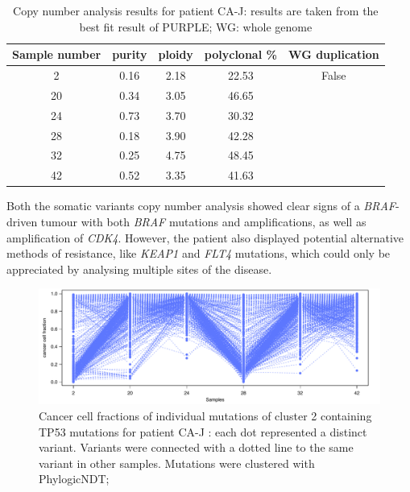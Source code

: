 \begin{table}[ht]
\caption[Copy number analysis results for patient CA-J]{Copy number analysis results for patient CA-J: results are taken from the best fit result of PURPLE; WG: whole genome}\label{tab:ca80cnv}
\centering
{}
\begin{tabular}{|c|c|c|c|c|}
\toprule
\hline
 \rowcolor{gray!50}
\textbf{Sample number} & \textbf{purity} & \textbf{ploidy} & \textbf{polyclonal \%} & \textbf{WG duplication}\\
\hline
 2  & \num{0.16} & \num{2.18} & \num{22.53} & False	\\
 20 & \num{0.34} & \num{3.05} & \num{46.65} & \cellcolor{gray!15} \\
 24 & \num{0.73} & \num{3.70} & \num{30.32} & \cellcolor{gray!15} \\
 28 & \num{0.18} & \num{3.90} & \num{42.28} & \cellcolor{gray!15} \\
 32 & \num{0.25} & \num{4.75} & \num{48.45} & \cellcolor{gray!15} \\
 42 & \num{0.52} & \num{3.35} & \num{41.63} & \cellcolor{gray!15}\multirow{-5}{*}{True} \\
 \hline
\bottomrule
\end{tabular}
\end{table} 


Both the somatic variants  copy number analysis showed clear signs of a \textit{BRAF}-driven tumour with both \textit{BRAF} mutations and amplifications, as well as amplification of \textit{CDK4}. However, the patient also displayed potential alternative methods of resistance, like \textit{KEAP1} and \textit{FLT4} mutations, which could only be appreciated by analysing multiple sites of the disease.


\begin{figure}[!h]
	\centering
	\includegraphics[width=.99\linewidth]{Figures/CASCADE/CA80/CA80.ccf_mutations.pdf}
	\caption[Cancer cell fractions of individual mutations for patient CA-J]{Cancer cell fractions of individual mutations of cluster 2 containing TP53 mutations for patient CA-J : each dot represented a distinct variant. Variants were connected with a dotted line to the same variant in other samples. Mutations were clustered with PhylogicNDT; } \label{fig:ca80ccfMuts}
\end{figure}


